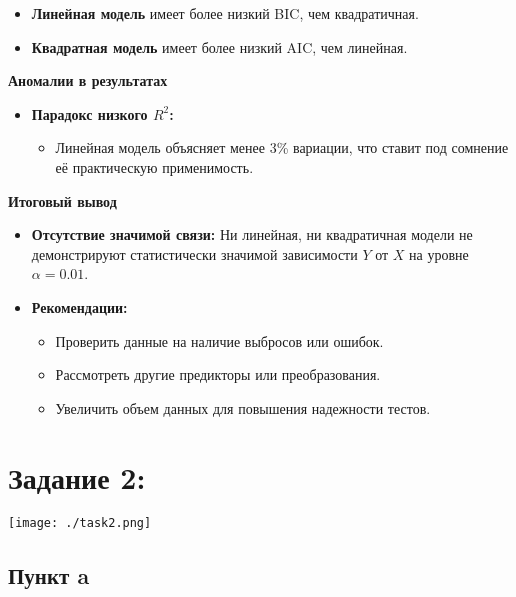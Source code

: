 \documentclass[12pt]{spbstu-task}
\begin{document}
\begin{itemize}
\item \textbf{Линейная модель} имеет более низкий BIC, чем квадратичная.
\item \textbf{Квадратная модель} имеет более низкий AIC, чем линейная.
\end{itemize}

\textbf{Аномалии в результатах}
\begin{itemize}
\item \textbf{Парадокс низкого \(R^2\):}
\begin{itemize}
\item Линейная модель объясняет менее 3\% вариации, что ставит под
сомнение её практическую применимость.
\end{itemize}
\end{itemize}

\textbf{Итоговый вывод}
\begin{itemize}
\item \textbf{Отсутствие значимой связи:} Ни линейная, ни квадратичная модели не
демонстрируют статистически значимой зависимости \(Y\) от \(X\) на
уровне 
\(\alpha = 0.01\).
\item \textbf{Рекомендации:}
\begin{itemize}
\item Проверить данные на наличие выбросов или ошибок.
\item Рассмотреть другие предикторы или преобразования.
\item Увеличить объем данных для повышения надежности тестов.
\end{itemize}
\end{itemize}
\section{\textbf{Задание} 2:}
\label{sec:org69c4c03}
\begin{center}
\texttt{[image: ./task2.png]}
\end{center}
\subsection{Пункт a}
\label{sec:orgc954c3a}
\end{document}
